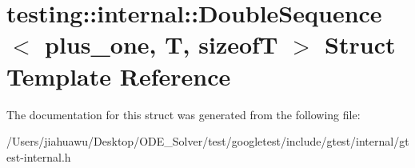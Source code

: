 \hypertarget{structtesting_1_1internal_1_1_double_sequence}{}\section{testing\+:\+:internal\+:\+:Double\+Sequence$<$ plus\+\_\+one, T, sizeofT $>$ Struct Template Reference}
\label{structtesting_1_1internal_1_1_double_sequence}


The documentation for this struct was generated from the following file\+:\begin{DoxyCompactItemize}
\item 
/\+Users/jiahuawu/\+Desktop/\+O\+D\+E\+\_\+\+Solver/test/googletest/include/gtest/internal/gtest-\/internal.\+h\end{DoxyCompactItemize}
